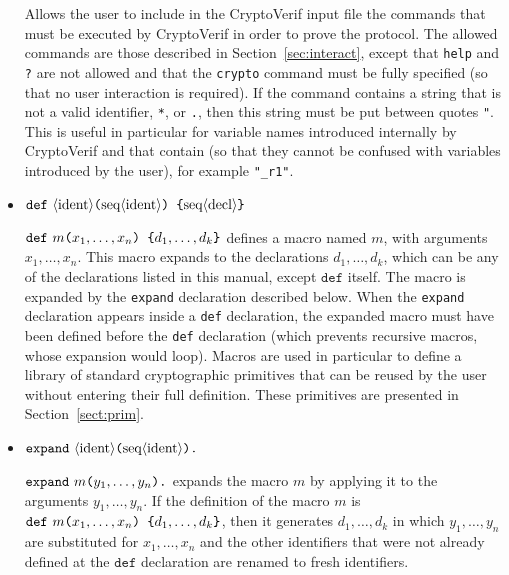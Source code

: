 \begin{itemize}
Allows the user to include in the CryptoVerif input file the commands
that must be executed by CryptoVerif in order to prove the protocol.
The allowed commands are those described in Section~\ref{sec:interact},
except that \texttt{help} and \texttt{?} are not allowed and that
the \texttt{crypto} command must be fully specified (so that no user 
interaction is required). If the command contains a string that
is not a valid identifier, \texttt{*}, or \texttt{.}, then this string
must be put between quotes \texttt{"}. This is useful in particular for
variable names introduced internally by CryptoVerif and that contain
\texttt{\string@} (so that they cannot be confused with variables introduced
by the user), for example \texttt{"\_r1"}.

\item ${\tt def\ }\nonterm{ident}\texttt{(}\seq{ident}\texttt{) \{}
\seq{decl}\texttt{\}}$ 

${\tt def\ }m\texttt{(}x_1, \ldots, x_n\texttt{) \{}
d_1, \ldots, d_k\texttt{\}}$ defines a macro named $m$, with arguments
$x_1, \ldots, x_n$. This macro expands to the declarations
$d_1, \ldots, d_k$, which can be any of the declarations listed in
this manual, except $\texttt{def}$ itself.
The macro is expanded by the \texttt{expand} declaration described below.
When the \texttt{expand} declaration appears inside a \texttt{def}
declaration, the expanded macro must have been defined before the
\texttt{def} declaration (which prevents recursive macros, whose
expansion would loop).
Macros are used in particular to define a library of standard
cryptographic primitives that can be reused by the user without
entering their full definition. These primitives are presented
in Section~\ref{sect:prim}.

\item ${\tt expand\ }\nonterm{ident}\texttt{(}\seq{ident}\texttt{).}$

${\tt expand\ }m\texttt{(}y_1, \ldots, y_n\texttt{).}$ expands the macro
$m$ by applying it to the arguments $y_1, \ldots, y_n$. If the definition
of the macro $m$ is ${\tt def\ }m\texttt{(}x_1, \ldots, x_n\texttt{) \{}
d_1, \ldots, d_k\texttt{\}}$, then it generates $d_1, \ldots, d_k$ in which
$y_1, \ldots, y_n$ are substituted for $x_1, \ldots, x_n$ and the other
identifiers that were not already defined at the $\texttt{def}$ declaration
are renamed to fresh identifiers.

\end{itemize}

